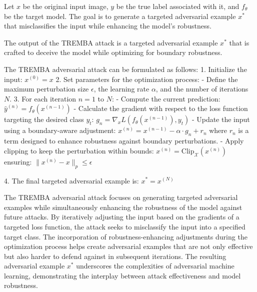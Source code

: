 
Let $x$ be the original input image, $y$ be the true label associated with it, and $f_{\theta}$ be the target model. The goal is to generate a targeted adversarial example $x^*$ that misclassifies the input while enhancing the model's robustness.

The output of the TREMBA attack is a targeted adversarial example $x^*$ that is crafted to deceive the model while optimizing for boundary robustness.

The TREMBA adversarial attack can be formulated as follows:
1. Initialize the input:
   $x^{(0)} = x$
2. Set parameters for the optimization process:
   - Define the maximum perturbation size $\epsilon$, the learning rate $\alpha$, and the number of iterations $N$.
3. For each iteration $n = 1$ to $N$:
   - Compute the current prediction:
   $\hat{y}^{(n)} = f_{\theta}(x^{(n-1)})$
   - Calculate the gradient with respect to the loss function targeting the desired class $y_t$:
   $g_n = \nabla_x L(f_{\theta}(x^{(n-1)}), y_t)$
   - Update the input using a boundary-aware adjustment:
   $x^{(n)} = x^{(n-1)} - \alpha \cdot g_n + r_n$
   where $r_n$ is a term designed to enhance robustness against boundary perturbations.
   - Apply clipping to keep the perturbation within bounds:
   $x^{(n)} = \text{Clip}_{\mathcal{X}}(x^{(n)})$
   ensuring:
   $\|x^{(n)} - x\|_p \leq \epsilon$

4. The final targeted adversarial example is:
   $x^* = x^{(N)}$

The TREMBA adversarial attack focuses on generating targeted adversarial examples while simultaneously enhancing the robustness of the model against future attacks. By iteratively adjusting the input based on the gradients of a targeted loss function, the attack seeks to misclassify the input into a specified target class. The incorporation of robustness-enhancing adjustments during the optimization process helps create adversarial examples that are not only effective but also harder to defend against in subsequent iterations. The resulting adversarial example $x^*$ underscores the complexities of adversarial machine learning, demonstrating the interplay between attack effectiveness and model robustness.